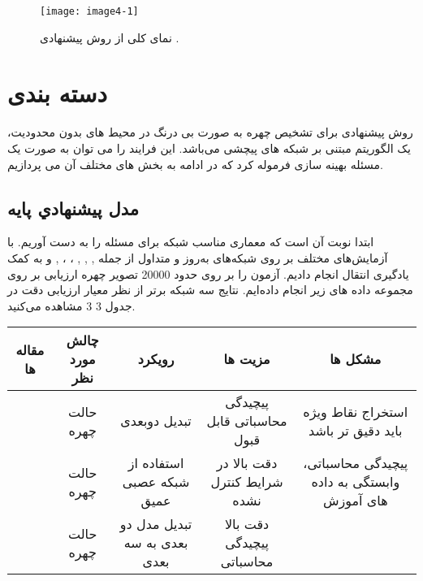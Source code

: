 \begin{figure}[h]
\centering
  \texttt{[image: image4-1]}
  \caption{نمای کلی از روش پیشنهادی \cite{ref1}.}
  \label{image2-1}
\end{figure}

%
%
\section{دسته بندی}
روش پیشنهادی برای تشخیص چهره به صورت بی درنگ در محیط های بدون محدودیت، یک الگوریتم مبتنی بر شبکه های پیچشی می‌باشد. این فرایند را می توان به صورت یک مسئله بهینه سازی فرموله کرد که در ادامه به بخش های مختلف آن می پردازیم.

\subsection{مدل پيشنهادي پايه}
ابتدا نوبت آن است که معماری مناسب شبکه برای مسئله را به دست آوریم. با آزمایش‌های مختلف بر روی شبکه‌های به‌روز و متداول از جمله
,
,
,
،
،
,
و
به کمک یادگیری انتقال انجام دادیم. آزمون را بر روی حدود 20000 تصویر چهره ارزیابی بر روی مجموعه داده های زیر‌ انجام داده‌ایم. نتایج سه شبکه برتر از نظر معیار‌ ارزیابی دقت در جدول ‏3 3 مشاهده می‌کنید. 
\begin{center}
\begin{tabular}{|c c c c c|}
\hline 
مقاله ها & چالش مورد نظر & رویکرد & مزیت ها & مشکل ها
\\
\hline 
 [23-26] & حالت چهره	 & تبدیل دوبعدی & 	پیچیدگی محاسباتی قابل قبول & 	استخراج نقاط ویژه باید دقیق تر باشد
 \\
\hline
[22, 27-30] & حالت چهره & 	استفاده از شبکه عصبی عمیق & دقت بالا در شرایط کنترل نشده & 	پیچیدگی محاسباتی، وابستگی به داده های آموزش 
\\
\hline
[11, 31-34] & حالت چهره & 	تبدیل مدل دو بعدی به سه بعدی & 	دقت بالا 	پیچیدگی محاسباتی
\\
\hline
\end{tabular}
\end{center}

